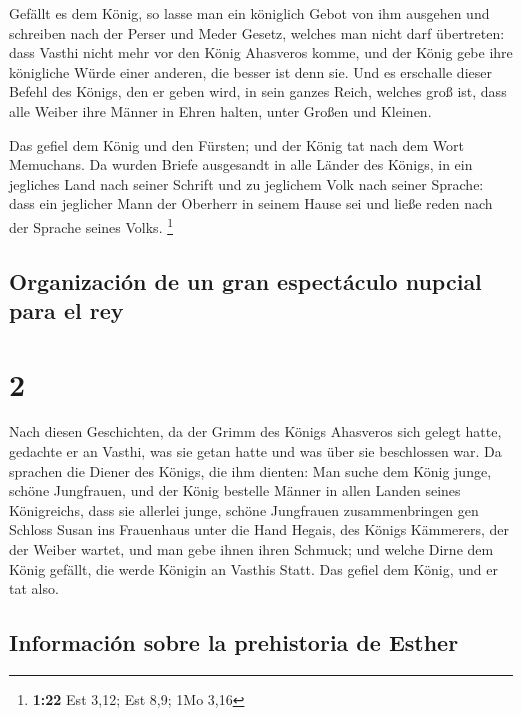  Gefällt es dem König, so lasse man ein königlich Gebot
von ihm ausgehen und schreiben nach der Perser und Meder Gesetz, welches
man nicht darf übertreten: dass Vasthi nicht mehr vor den König
Ahasveros komme, und der König gebe ihre königliche Würde einer anderen,
die besser ist denn sie.  Und es erschalle dieser Befehl
des Königs, den er geben wird, in sein ganzes Reich, welches groß ist,
dass alle Weiber ihre Männer in Ehren halten, unter Großen und Kleinen.

 Das gefiel dem König und den Fürsten; und der König tat
nach dem Wort Memuchans.  Da wurden Briefe ausgesandt in
alle Länder des Königs, in ein jegliches Land nach seiner Schrift und zu
jeglichem Volk nach seiner Sprache: dass ein jeglicher Mann der Oberherr
in seinem Hause sei und ließe reden nach der Sprache seines Volks.
\footnote{\textbf{1:22} Est 3,12; Est 8,9; 1Mo 3,16}

\hypertarget{organizaciuxf3n-de-un-gran-espectuxe1culo-nupcial-para-el-rey}{%
\subsection{Organización de un gran espectáculo nupcial para el
rey}\label{organizaciuxf3n-de-un-gran-espectuxe1culo-nupcial-para-el-rey}}

\hypertarget{section-1}{%
\section{2}\label{section-1}}

 Nach diesen Geschichten, da der Grimm des Königs
Ahasveros sich gelegt hatte, gedachte er an Vasthi, was sie getan hatte
und was über sie beschlossen war.  Da sprachen die Diener
des Königs, die ihm dienten: Man suche dem König junge, schöne
Jungfrauen,  und der König bestelle Männer in allen Landen
seines Königreichs, dass sie allerlei junge, schöne Jungfrauen
zusammenbringen gen Schloss Susan ins Frauenhaus unter die Hand Hegais,
des Königs Kämmerers, der der Weiber wartet, und man gebe ihnen ihren
Schmuck;  und welche Dirne dem König gefällt, die werde
Königin an Vasthis Statt. Das gefiel dem König, und er tat also.

\hypertarget{informaciuxf3n-sobre-la-prehistoria-de-esther}{%
\subsection{Información sobre la prehistoria de
Esther}\label{informaciuxf3n-sobre-la-prehistoria-de-esther}}

